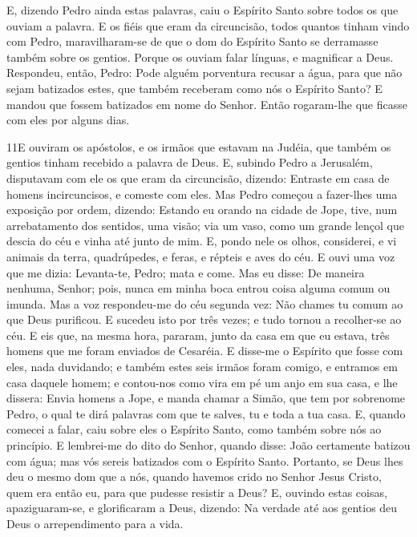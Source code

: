 E, dizendo Pedro ainda estas palavras, caiu o Espírito Santo
sobre todos os que ouviam a palavra. E os fiéis que eram da
circuncisão, todos quantos tinham vindo com Pedro, maravilharam-se
de que o dom do Espírito Santo se derramasse também sobre os
gentios. Porque os ouviam falar línguas, e magnificar a Deus.
Respondeu, então, Pedro: Pode alguém porventura recusar a
água, para que não sejam batizados estes, que também receberam como
nós o Espírito Santo? E mandou que fossem batizados em nome
do Senhor. Então rogaram-lhe que ficasse com eles por alguns dias.

\medskip

\lettrine{11} E ouviram os apóstolos, e os irmãos que estavam
na Judéia, que também os gentios tinham recebido a palavra de Deus.
E, subindo Pedro a Jerusalém, disputavam com ele os que eram da
circuncisão, dizendo: Entraste em casa de homens incircuncisos,
e comeste com eles. Mas Pedro começou a fazer-lhes uma exposição
por ordem, dizendo: Estando eu orando na cidade de Jope, tive,
num arrebatamento dos sentidos, uma visão; via um vaso, como um
grande lençol que descia do céu e vinha até junto de mim. E,
pondo nele os olhos, considerei, e vi animais da terra, quadrúpedes,
e feras, e répteis e aves do céu. E ouvi uma voz que me dizia:
Levanta-te, Pedro; mata e come. Mas eu disse: De maneira
nenhuma, Senhor; pois, nunca em minha boca entrou coisa alguma comum
ou imunda. Mas a voz respondeu-me do céu segunda vez: Não chames
tu comum ao que Deus purificou. E sucedeu isto por três
vezes; e tudo tornou a recolher-se ao céu. E eis que, na
mesma hora, pararam, junto da casa em que eu estava, três homens que
me foram enviados de Cesaréia. E disse-me o Espírito que
fosse com eles, nada duvidando; e também estes seis irmãos foram
comigo, e entramos em casa daquele homem; e contou-nos como
vira em pé um anjo em sua casa, e lhe dissera: Envia homens a Jope,
e manda chamar a Simão, que tem por sobrenome Pedro, o qual
te dirá palavras com que te salves, tu e toda a tua casa. E,
quando comecei a falar, caiu sobre eles o Espírito Santo, como
também sobre nós ao princípio. E lembrei-me do dito do
Senhor, quando disse: João certamente batizou com água; mas vós
sereis batizados com o Espírito Santo. Portanto, se Deus lhes
deu o mesmo dom que a nós, quando havemos crido no Senhor Jesus
Cristo, quem era então eu, para que pudesse resistir a Deus?
E, ouvindo estas coisas, apaziguaram-se, e glorificaram a
Deus, dizendo: Na verdade até aos gentios deu Deus o arrependimento
para a vida.

